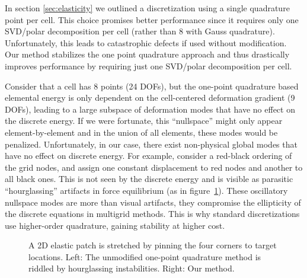 In section \ref{sec:elasticity} we outlined a discretization using a single quadrature point per cell. This choice promises better performance since it requires only one SVD/polar decomposition per cell (rather than 8 with Gauss quadrature). Unfortunately, this leads to catastrophic defects if used without modification. Our method stabilizes the one point quadrature approach and thus drastically improves performance by requiring just one SVD/polar decomposition per cell.

Consider that a cell has 8 points (24 DOFs), but the one-point quadrature based elemental energy is only dependent on the cell-centered deformation gradient (9 DOFs), leading to a large subspace of deformation modes that have no effect on the discrete energy. If we were
fortunate, this ``nullspace'' might only appear element-by-element and in the
union of all elements, these modes would be penalized. Unfortunately, in our
case, there exist non-physical global modes that have no effect on discrete
energy. For example, consider a red-black ordering of the grid nodes, and assign one
constant displacement to red nodes and another to all black ones. This is not
seen by the discrete energy and is visible as parasitic ``hourglassing''
artifacts in force equilibrium (as in figure~\ref{fig_instability}).  These
oscillatory nullspace modes are more than visual artifacts, they compromise the
ellipticity of the discrete equations in multigrid methods. This is why standard
discretizations use higher-order quadrature, gaining stability at higher cost.

\begin{figure}[tbh]
\caption[A 2D comparison of quadrature rules]{A 2D elastic patch is stretched by pinning the four corners to target locations. Left: The unmodified one-point quadrature method is riddled by hourglassing
  instabilities. Right: Our method.}
\vspace{-10pt}
\label{fig_instability}
\end{figure}


